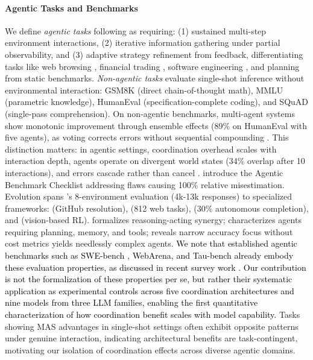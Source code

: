 \paragraph{Agentic Tasks and Benchmarks}

We define \textit{agentic tasks} following \citet{zhu2025establishing} as requiring: (1) sustained multi-step environment interactions, (2) iterative information gathering under partial observability, and (3) adaptive strategy refinement from feedback, differentiating tasks like web browsing \citep{wei2025browsecomp, zhou2024webarena}, financial trading \citep{bigeard2025finance}, software engineering \citep{jimenez2023swebench}, and planning \citep{dagan2024plancraft} from static benchmarks. \textit{Non-agentic tasks} evaluate single-shot inference without environmental interaction: GSM8K \citep{cobbe2021gsm8k} (direct chain-of-thought math), MMLU \citep{hendrycks2020mmlu} (parametric knowledge), HumanEval \citep{chen2021humaneval} (specification-complete coding), and SQuAD \citep{rajpurkar2016squad} (single-pass comprehension). On non-agentic benchmarks, multi-agent systems show monotonic improvement through ensemble effects (89\% on HumanEval with five agents), as voting corrects errors without sequential compounding \citep{kapoor2024agents}. This distinction matters: in agentic settings, coordination overhead scales with interaction depth, agents operate on divergent world states (34\% overlap after 10 interactions), and errors cascade rather than cancel \citep{kapoor2024agents}. \citet{zhu2025establishing} introduce the Agentic Benchmark Checklist addressing flaws causing 100\% relative misestimation. Evolution spans \citet{liu2023agentbench}'s 8-environment evaluation (4k-13k responses) to specialized frameworks: \citet{jimenez2023swebench} (GitHub resolution), \citet{zhou2024webarena} (812 web tasks), \citet{xu2024theagentcompany} (30\% autonomous completion), and \citet{paglieri2024balrog} (vision-based RL). \citet{yao2023react} formalizes reasoning-acting synergy; \citet{weng2023llmagent} characterizes agents requiring planning, memory, and tools; \citet{kapoor2024agents} reveals narrow accuracy focus without cost metrics yields needlessly complex agents. \textcolor{black}{We note that established agentic benchmarks such as SWE-bench \cite{jimenez2023swe}, WebArena, and Tau-bench already embody these evaluation properties, as discussed in recent survey work \cite{yehudai2025survey}. Our contribution is not the formalization of these properties per se, but rather their systematic application as experimental controls across five coordination architectures and nine models from three LLM families, enabling the first quantitative characterization of how coordination benefit scales with model capability.} Tasks showing MAS advantages in single-shot settings often exhibit opposite patterns under genuine interaction, indicating architectural benefits are task-contingent, motivating our isolation of coordination effects across diverse agentic domains.

